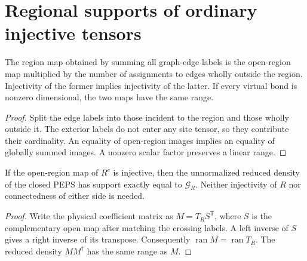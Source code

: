 \section{Regional supports of ordinary injective tensors}%
\label{sec:peps_injective_region_support}

\begin{lemma}%
    \label{lem:peps_injective_region_actual_map}
    \leanok
    The region map obtained by summing all graph-edge labels is the
    open-region map multiplied by the number of assignments to
    edges wholly outside the region. Injectivity of the former implies
    injectivity of the latter. If every virtual bond is nonzero
    dimensional, the two maps have the same range.
\end{lemma}

\begin{proof}\leanok
    Split the edge labels into those incident to the region and those
    wholly outside it. The exterior labels do not enter any site tensor,
    so they contribute their cardinality. An equality of open-region images
    implies an equality of globally summed images. A nonzero scalar
    factor preserves a linear range.
\end{proof}

\begin{lemma}%
    \label{thm:peps_injective_complement_region_support}
    \leanok
    If the open-region map of $R^c$ is injective, then the
    unnormalized reduced density of the closed PEPS has support
    exactly equal to $\mathcal G_R$. Neither injectivity of $R$
    nor connectedness of either side is needed.
\end{lemma}

\begin{proof}\leanok
    Write the physical coefficient matrix as $M=T_RS^\mathsf T$,
    where $S$ is the complementary open map after matching the crossing
    labels. A left inverse of $S$ gives a right inverse of its transpose.
    Consequently $\operatorname{ran}M=\operatorname{ran}T_R$.
    The reduced density $MM^\dagger$ has the same range as $M$.
\end{proof}

